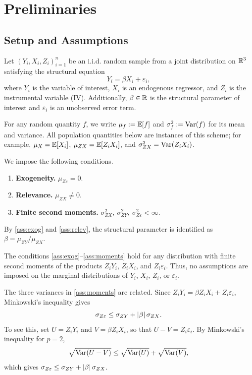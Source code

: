 \section{Preliminaries}

\subsection{Setup and Assumptions}
Let $(Y_i, X_i, Z_i)_{i=1}^{n}$ be an i.i.d. random sample from a joint distribution on $\mathbb{R}^3$ satisfying the structural equation
\begin{equation}
\label{eq:structural}
    Y_i = \beta X_i + \varepsilon_i,
\end{equation}
where $Y_i$ is the variable of interest, $X_i$ is an endogenous regressor, and $Z_i$ is the instrumental variable (IV). Additionally, $\beta \in \mathbb{R}$ is the structural parameter of interest and $\varepsilon_i$ is an unobserved error term. 

For any random quantity $f$, we write $\mu_f := \operatorname{\mathbb{E}}[f]$ and $\sigma_f^2 := \operatorname{Var}(f)$ for its mean and variance. All population quantities below are instances of this scheme; for example, $\mu_X = \operatorname{\mathbb{E}}[X_i]$, $\mu_{ZX} = \operatorname{\mathbb{E}}[Z_i X_i]$, and $\sigma_{ZX}^2 = \operatorname{Var}(Z_i X_i)$.

We impose the following conditions.
\begin{enumerate}[label=(A\arabic*)]
    \item \label{ass:exog} \textbf{Exogeneity.} $\mu_{Z\varepsilon} = 0$.
    \item \label{ass:relev} \textbf{Relevance.} $\mu_{ZX} \neq 0$.
    \item \label{ass:moments} \textbf{Finite second moments.} $\sigma_{ZX}^2,\ \sigma_{ZY}^2,\ \sigma_{Z\varepsilon}^2 < \infty$.
\end{enumerate}

By \ref{ass:exog} and \ref{ass:relev}, the structural parameter is identified as $\beta = \mu_{ZY}/\mu_{ZX}$.

\begin{remark}
The conditions \ref{ass:exog}--\ref{ass:moments} hold for any distribution with finite second moments of the products $Z_iY_i$, $Z_iX_i$, and $Z_i\varepsilon_i$. Thus, no assumptions are imposed on the marginal distributions of $Y_i$, $X_i$, $Z_i$, or $\varepsilon_i$.
\end{remark}

\begin{remark}
\label{rem:minkowski}
The three variances in \ref{ass:moments} are related. Since $Z_i Y_i = \beta Z_i X_i + Z_i\varepsilon_i$, Minkowski's inequality gives
\begin{equation}
\label{eq:minkowski}
    \sigma_{Z\varepsilon} \leq \sigma_{ZY} + \left|\beta\right|\sigma_{ZX}.
\end{equation}
To see this, set $U = Z_i Y_i$ and $V = \beta Z_i X_i$, so that $U - V = Z_i\varepsilon_i$. By Minkowski's inequality for $p = 2$,
\[
    \sqrt{\operatorname{Var}(U - V)} \leq \sqrt{\operatorname{Var}(U)} + \sqrt{\operatorname{Var}(V)},
\]
which gives $\sigma_{Z\varepsilon} \leq \sigma_{ZY} + \left|\beta\right|\sigma_{ZX}$.
\end{remark}


